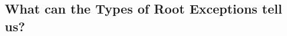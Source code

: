 \documentclass[conference]{IEEEtran}
\begin{document}




\subsection{What can the Types of Root Exceptions tell us?}
\end{document}
